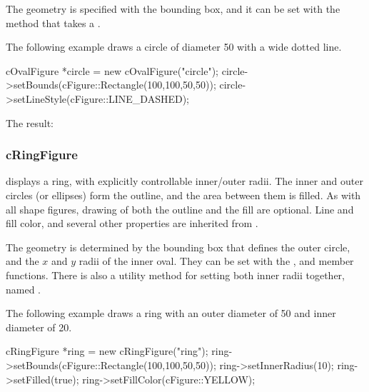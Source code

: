 The geometry is specified with the bounding box, and it can be set with the
 method that takes a .

The following example draws a circle of diameter 50 with a wide dotted line.

\begin{cpp}
cOvalFigure *circle = new cOvalFigure("circle");
circle->setBounds(cFigure::Rectangle(100,100,50,50));
circle->setLineStyle(cFigure::LINE_DASHED);
\end{cpp}


The result:

\begin{center}

\end{center}


\subsubsection{cRingFigure}
\label{sec:graphics:ringfigure}

 displays a ring, with explicitly controllable
inner/outer radii. The inner and outer circles (or ellipses) form the
outline, and the area between them is filled. As with all shape figures,
drawing of both the outline and the fill are optional. Line and fill color,
and several other properties are inherited from
.

The geometry is determined by the bounding box that defines the outer
circle, and the $x$ and $y$ radii of the inner oval. They can be set with
the ,  and 
member functions. There is also a utility method for setting both
inner radii together, named .

The following example draws a ring with an outer diameter of 50 and
inner diameter of 20.

\begin{cpp}
cRingFigure *ring = new cRingFigure("ring");
ring->setBounds(cFigure::Rectangle(100,100,50,50));
ring->setInnerRadius(10);
ring->setFilled(true);
ring->setFillColor(cFigure::YELLOW);
\end{cpp}


\begin{center}

\end{center}


